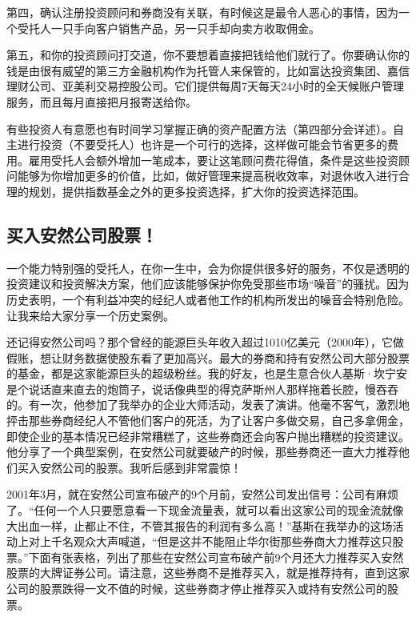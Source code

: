 第四，确认注册投资顾问和券商没有关联，有时候这是最令人恶心的事情，因为一个受托人一只手向客户销售产品，另一只手却向卖方收取佣金。

第五，和你的投资顾问打交道，你不要想着直接把钱给他们就行了。你要确认你的钱是由很有威望的第三方金融机构作为托管人来保管的，比如富达投资集团、嘉信理财公司、亚美利交易控股公司。它们提供每周7天每天24小时的全天候账户管理服务，而且每月直接把月报寄送给你。

有些投资人有意愿也有时间学习掌握正确的资产配置方法（第四部分会详述）。自主进行投资（不要受托人）也许是一个可行的选择，这样做可能会节省更多的费用。雇用受托人会额外增加一笔成本，要让这笔顾问费花得值，条件是这些投资顾问能够为你增加更多的价值，比如，做好管理来提高税收效率，对退休收入进行合理的规划，提供指数基金之外的更多投资选择，扩大你的投资选择范围。

\subsection{买入安然公司股票！}

一个能力特别强的受托人，在你一生中，会为你提供很多好的服务，不仅是透明的投资建议和投资解决方案，他们应该能够保护你免受那些市场“噪音”的骚扰。因为历史表明，一个有利益冲突的经纪人或者他工作的机构所发出的噪音会特别危险。让我来给大家分享一个历史案例。

还记得安然公司吗？那个曾经的能源巨头年收入超过1010亿美元（2000年），它做假账，想让财务数据使股东看了更加高兴。最大的券商和持有安然公司大部分股票的基金，都是这家能源巨头的超级粉丝。我的好友，也是生意合伙人基斯·坎宁安是个说话直来直去的炮筒子，说话像典型的得克萨斯州人那样拖着长腔，慢吞吞的。有一次，他参加了我举办的企业大师活动，发表了演讲。他毫不客气，激烈地抨击那些券商经纪人不管他们客户的死活，为了让客户多做交易，自己多拿佣金，即使企业的基本情况已经非常糟糕了，这些券商还会向客户抛出糟糕的投资建议。他分享了一个典型案例，在安然公司就要破产的时候，那些券商还一直大力推荐他们买入安然公司的股票。我听后感到非常震惊！

2001年3月，就在安然公司宣布破产的9个月前，安然公司发出信号：公司有麻烦了。“任何一个人只要愿意看一下现金流量表，就可以看出这家公司的现金流就像大出血一样，止都止不住，不管其报告的利润有多么高！”基斯在我举办的这场活动上对上千名观众大声喊道，“但是这并不能阻止华尔街那些券商大力推荐这只股票。”下面有张表格，列出了那些在安然公司宣布破产前9个月还大力推荐买入安然股票的大牌证券公司。请注意，这些券商不是推荐买入，就是推荐持有，直到这家公司的股票跌得一文不值的时候，这些券商才停止推荐买入或持有安然公司的股票。



